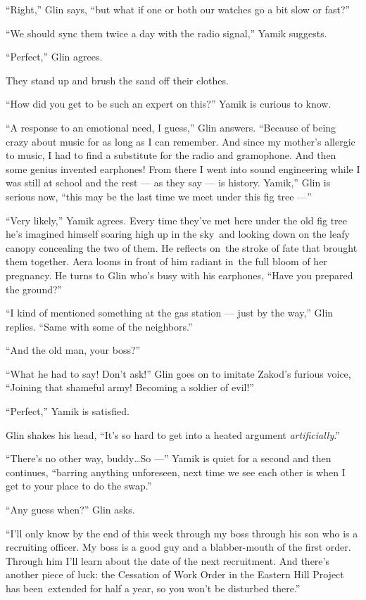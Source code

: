 \documentclass[twoside,11pt]{book}
\begin{document}
``Right,'' Glin says, ``but what if one or both our watches go a bit slow or
fast?''

``We should sync them twice a day with the radio signal,'' Yamik suggests.

``Perfect,'' Glin agrees.

They stand up and brush the sand off their clothes.

``How did you get to be such an expert on this?''  Yamik is curious to know.

``A response to an emotional need, I guess,'' Glin answers. ``Because of being
crazy about music for as long as I can remember. And since my mother's allergic to music, I had to find a substitute for
the radio and gramophone. And then some genius invented earphones! From there I went into sound engineering while I was
still at school and the rest --- as they say --- is history. Yamik,'' Glin is serious now, ``this
may be the last time we meet under this fig tree ---''

``Very likely,'' Yamik agrees. Every time they've met here under the old fig tree he's
imagined himself soaring high up in the sky~and looking down on the leafy canopy concealing the two of them. He
reflects on~the stroke of fate that brought them together.  Aera looms in front of him radiant in~the full bloom of
her pregnancy. He turns to Glin who's busy with his earphones, ``Have you prepared the
ground?''

``I kind of mentioned something at the gas station --- just by the way,'' Glin replies.
``Same with some of the neighbors.''

``And the old man, your boss?''

``What he had to say! Don't ask!'' Glin goes on to imitate Zakod's furious voice,
``Joining that shameful army! Becoming a soldier of evil!''

``Perfect,'' Yamik is satisfied.

Glin shakes his head, ``It's so hard to get into a heated argument \textit{artificially}.''

``There's no other way, buddy{\ldots}So ---'' Yamik is quiet for a second and then continues,
``barring anything unforeseen, next time we see each other is when I get to your place to do the
swap.''

``Any guess when?'' Glin asks.

``I'll only know by the end of this week through my boss through his son who is a recruiting officer. My
boss is a good guy and a blabber-mouth of the first order. Through him I'll learn about the date of the next
recruitment. And there's another piece of luck: the Cessation of Work Order in the Eastern Hill Project has
been~extended for half a year, so you won't be disturbed there.''
\end{document}
